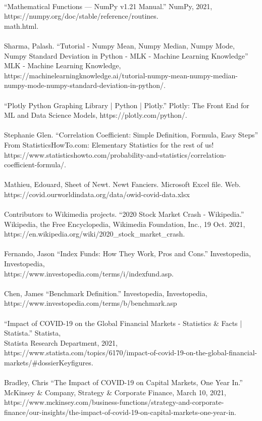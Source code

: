 \documentclass[fontsize=11pt]{article}
\begin{document}
\\
“Mathematical Functions — NumPy v1.21 Manual.” NumPy, 2021, https://numpy.org/doc/stable/reference/routines.\\
math.html.
\\
\\
Sharma, Palash. “Tutorial - Numpy Mean, Numpy Median, Numpy Mode, Numpy Standard Deviation in Python - MLK - Machine Learning Knowledge” MLK - Machine Learning Knowledge, 
https://machinelearningknowledge.ai/tutorial-numpy-mean-numpy-median-numpy-mode-numpy-standard-deviation-in-python/.
\\
\\
“Plotly Python Graphing Library | Python | Plotly.” Plotly: The Front End for ML and Data Science Models, https://plotly.com/python/.
\\
\\
Stephanie Glen. “Correlation Coefficient: Simple Definition, Formula, Easy Steps” From StatisticsHowTo.com: Elementary Statistics for the rest of us! https://www.statisticshowto.com/probability-and-statistics/correlation-coefficient-formula/.
\\
\\
Mathieu, Edouard, Sheet of Newt. Newt Fanciers. Microsoft Excel file. Web. {https://covid.ourworldindata.org/data/owid-covid-data.xlsx}\\ \\
Contributors to Wikimedia projects. “2020 Stock Market Crash - Wikipedia.” Wikipedia, the Free Encyclopedia, Wikimedia Foundation, Inc., 19 Oct. 2021, {https://en.wikipedia.org/wiki/2020\_stock\_market\_crash}.\\ \\
Fernando, Jason “Index Funds: How They Work, Pros and Cons.”
Investopedia, Investopedia,  \\{https://www.investopedia.com/terms/i/indexfund.asp}.\\ \\ 
Chen, James “Benchmark Definition.”  Investopedia, Investopedia,  https://www.investopedia.com/terms/b/benchmark.asp\\ \\ 
“Impact of COVID-19 on the Global Financial Markets - Statistics \& Facts | Statista.” Statista,\\
Statista Research Department, 2021,  https://www.statista.com/topics/6170/impact-of-covid-19-on-the-global-financial-markets/\#dossierKeyfigures.\\ \\
Bradley, Chris “The Impact of COVID-19 on Capital Markets, One Year In.” McKinsey \& Company, Strategy \& Corporate Finance, March 10, 2021, https://www.mckinsey.com/business-functions/strategy-and-corporate-finance/our-insights/the-impact-of-covid-19-on-capital-markets-one-year-in.
\end{document}
